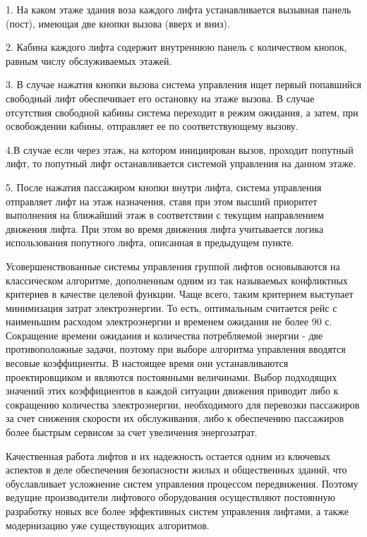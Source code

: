 	1. На каком этаже здания воза каждого лифта устанавливается вызывная панель (пост), имеющая две кнопки вызова (вверх и вниз).

	2. Кабина каждого лифта содержит внутреннюю панель с количеством кнопок, равным числу обслуживаемых этажей.

	3. В случае нажатия кнопки вызова система управления ищет первый попавшийся свободный лифт обеспечивает его остановку на этаже вызова.
		В случае отсутствия свободной кабины система переходит в режим ожидания, а затем, при освобождении кабины,
		отправляет ее по соответствующему вызову.

	4.В случае если через этаж, на котором инициирован вызов, проходит попутный лифт, то попутный лифт останавливается системой управления на данном этаже.

	5. После нажатия пассажиром кнопки внутри лифта, система управления отправляет лифт на этаж назначения, ставя при этом высший приоритет
		выполнения на ближайший этаж в соответствии с текущим направлением движения лифта.
		При этом во время движения лифта учитывается логика использования попутного лифта, описанная в предыдущем пункте.

	Усовершенствованные системы управления группой лифтов основываются на классическом алгоритме, дополненным одним из так называемых конфликтных критериев
		в качестве целевой функции. Чаще всего, таким критерием выступает минимизация затрат электроэнергии. То есть, оптимальным считается рейс
		с наименьшим расходом электроэнергии и временем ожидания не более 90 с. Сокращение времени ожидания и количества потребляемой энергии -
		две противоположные задачи, поэтому при выборе алгоритма управления вводятся весовые коэффициенты.
		В настоящее время они устанавливаются проектировщиком и являются постоянными величинами. Выбор подходящих значений этих коэффициентов
		в каждой ситуации движения приводит либо к сокращению количества электроэнергии, необходимого для перевозки пассажиров за счет снижения скорости
		их обслуживания, либо к обеспечению пассажиров более быстрым сервисом за счет увеличения энергозатрат.

	Качественная работа лифтов и их надежность остается одним из ключевых аспектов в деле обеспечения безопасности жилых и общественных зданий,
		что обуславливает усложнение систем управления процессом передвижения. Поэтому ведущие производители лифтового оборудования осуществляют
		постоянную разработку новых все более эффективных систем управления лифтами, а также модернизацию уже существующих алгоритмов.

